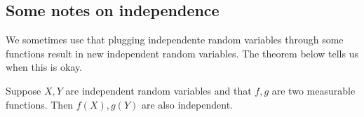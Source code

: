 
\subsection{Some notes on independence}

We sometimes use that plugging independente random variables through some functions result in new independent random variables. The theorem below tells us when this is okay. 


\begin{theorem}
    Suppose $X, Y$ are independent random variables and that $f, g$ are two measurable functions. Then $f(X), g(Y)$ are also independent. 
\end{theorem}

